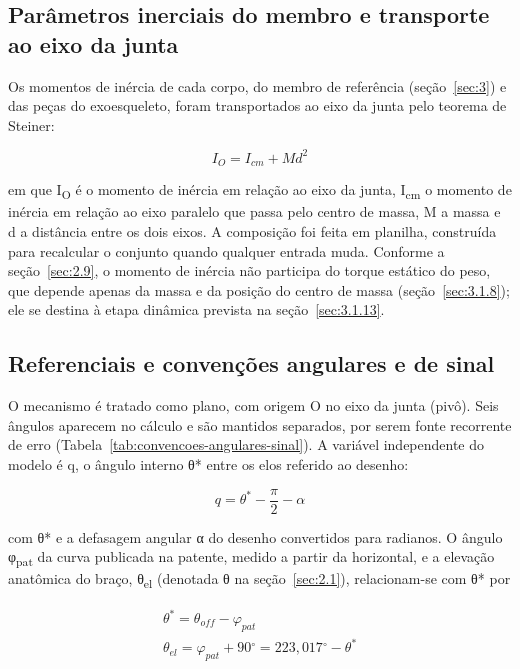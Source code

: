 \subsection{Parâmetros inerciais do membro e transporte ao eixo da junta}\label{sec:3.1.2}

Os momentos de inércia de cada corpo, do membro de referência (seção~\ref{sec:3}) e das peças do exoesqueleto, foram transportados ao eixo da junta pelo teorema de Steiner:

\begin{equation}
  I_{O} = I_{cm} + Md^{2}
  \label{eq:01}
\end{equation}

em que I\textsubscript{O} é o momento de inércia em relação ao eixo da junta, I\textsubscript{cm} o momento de inércia em relação ao eixo paralelo que passa pelo centro de massa, M a massa e d a distância entre os dois eixos. A composição foi feita em planilha, construída para recalcular o conjunto quando qualquer entrada muda. Conforme a seção~\ref{sec:2.9}, o momento de inércia não participa do torque estático do peso, que depende apenas da massa e da posição do centro de massa (seção~\ref{sec:3.1.8}); ele se destina à etapa dinâmica prevista na seção~\ref{sec:3.1.13}.

\subsection{Referenciais e convenções angulares e de sinal}\label{sec:3.1.3}

O mecanismo é tratado como plano, com origem O no eixo da junta (pivô). Seis ângulos aparecem no cálculo e são mantidos separados, por serem fonte recorrente de erro (Tabela~\ref{tab:convencoes-angulares-sinal}). A variável independente do modelo é q, o ângulo interno θ* entre os elos referido ao desenho:

\begin{equation}
  q = \theta^{*} - \frac{\pi}{2} - \alpha
  \label{eq:02}
\end{equation}

com θ* e a defasagem angular α do desenho convertidos para radianos. O ângulo φ\textsubscript{pat} da curva publicada na patente, medido a partir da horizontal, e a elevação anatômica do braço, θ\textsubscript{el} (denotada θ na seção~\ref{sec:2.1}), relacionam-se com θ* por

\begin{gather}
  \theta^{*} = \theta_{off} - \varphi_{pat} \label{eq:03} \\
  \theta_{el} = \varphi_{pat} + 90{^\circ} = 223{,}017{^\circ} - \theta^{*} \label{eq:04}
\end{gather}

